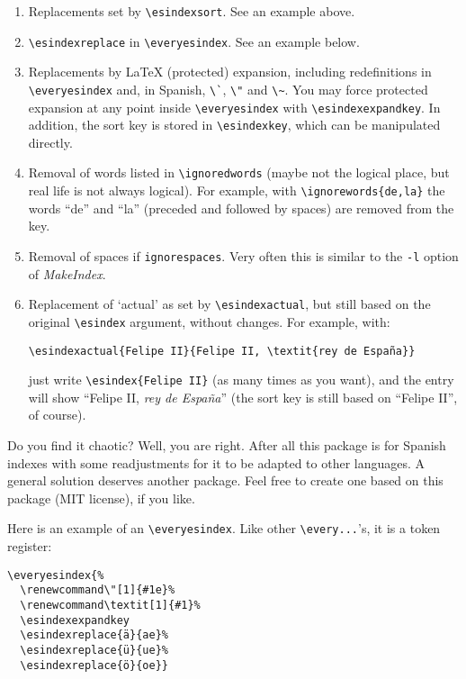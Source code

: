 \documentclass{article}
\begin{document}
\begin{enumerate}
\item Replacements set by \verb|\esindexsort|. See an example above.

\item \verb|\esindexreplace| in \verb|\everyesindex|. See an example
below.

\item Replacements by \LaTeX{} (protected) expansion, including
redefinitions in \verb|\everyesindex| and, in Spanish, \verb|\`|,
\verb|\"| and \verb|\~|. You may force protected expansion at any point
inside \verb|\everyesindex| with \verb|\esindexexpandkey|. In addition,
the sort key is stored in \verb|\esindexkey|, which can be manipulated
directly.

\item Removal of words listed in \verb|\ignoredwords| (maybe not the
logical place, but real life is not always logical). For example, with
\verb|\ignorewords{de,la}| the words “de” and “la” (preceded and
followed by spaces) are removed from the key.

\item Removal of spaces if \verb|ignorespaces|. Very often this is
similar to the \verb|-l| option of \textit{MakeIndex}.

\item Replacement of `actual' as set by \verb|\esindexactual|, but
still based on the original \verb|\esindex| argument, without changes.
For example, with:
\begin{verbatim}
\esindexactual{Felipe II}{Felipe II, \textit{rey de España}}
\end{verbatim}
just write \verb|\esindex{Felipe II}| (as many times as you want), and
the entry will show “Felipe II, \textit{rey de España}” (the sort key
is still based on “Felipe II”, of course).

\end{enumerate}

Do you find it chaotic? Well, you are right. After all this package is
for Spanish indexes with some readjustments for it to be adapted to
other languages. A general solution deserves another package. Feel free
to create one based on this package (MIT license), if you like.

Here is an example of an \verb|\everyesindex|. Like other
\verb|\every...|'s, it is a token register:
\begin{verbatim}
\everyesindex{%
  \renewcommand\"[1]{#1e}%
  \renewcommand\textit[1]{#1}%
  \esindexexpandkey
  \esindexreplace{ä}{ae}%
  \esindexreplace{ü}{ue}%
  \esindexreplace{ö}{oe}}
\end{verbatim}
\end{document}
